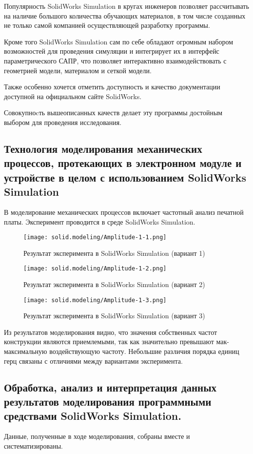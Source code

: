 Популярность SolidWorks Simulation в кругах инженеров позволяет
рассчитывать на наличие большого количества обучающих материалов, в
том числе созданных не только самой компанией осуществляющей
разработку программы.

Кроме того SolidWorks Simulation сам по себе обладают огромным набором
возможностей для проведения симуляции и интегрирует их в интерфейс
параметрического САПР, что позволяет интерактивно взаимодействовать с
геометрией модели, материалом и сеткой модели.

Также особенно хочется отметить доступность и качество документации
доступной на официальном сайте SolidWorks.

Совокупноcть вышеописанных качеств делает эту программы достойным
выбором для проведения исследования.

\subsection{Технология моделирования механических процессов,
протекающих в электронном модуле и устройстве в целом с
использованием  SolidWorks Simulation}

В моделирование механических процессов включает частотный анализ
печатной платы. Эксперимент проводится в среде SolidWorks Simulation.

\begin{figure}[H]
  \centering
  \texttt{[image: solid.modeling/Amplitude-1-1.png]}
  \caption{Результат эксперимента в SolidWorks Simulation (вариант 1)}
\end{figure}

\begin{figure}[H]
  \centering
  \texttt{[image: solid.modeling/Amplitude-1-2.png]}
  \caption{Результат эксперимента в SolidWorks Simulation (вариант 2)}
\end{figure}

\begin{figure}[H]
  \centering
  \texttt{[image: solid.modeling/Amplitude-1-3.png]}
  \caption{Результат эксперимента в SolidWorks Simulation (вариант 3)}
\end{figure}

Из результатов моделирования видно, что значения собственных частот
конструкции являются приемлемыми, так как значительно превышают
мак-максимальную воздействующую частоту. Небольшие различия порядка
единиц герц связаны с отличиями между вариантами эксперимента.

\subsection{Обработка, анализ и интерпретация данных результатов
моделирования программными средствами SolidWorks Simulation.}

Данные, полученные в ходе моделирования, собраны вместе и
систематизированы.



\newpage


